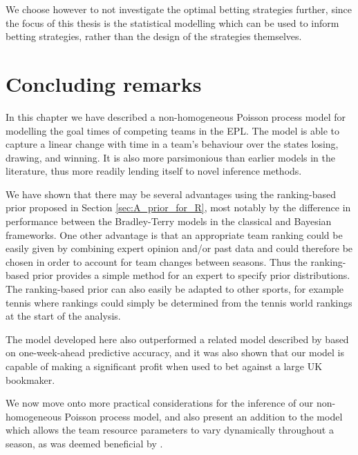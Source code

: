 We choose however to not investigate the optimal betting strategies further, since the focus of this thesis is the
statistical modelling which can be used to inform betting strategies, rather than the design of the strategies
themselves.


\section{Concluding remarks} 
\label{sec:Concluding_remarks_adaptive}

In this chapter we have described a non-homogeneous Poisson process model for modelling the goal times of competing
teams in the \gls{EPL}. The model is able to capture a linear change with time in a team's behaviour over the states
losing, drawing, and winning. It is also more parsimonious than earlier models in the literature, thus more readily
lending itself to novel inference methods.

We have shown that there may be several advantages using the ranking-based prior proposed in Section
\ref{sec:A_prior_for_R}, most notably by the difference in performance between the Bradley-Terry models in the classical
and Bayesian frameworks. One other advantage is that an appropriate team ranking could be easily given by combining
expert opinion and/or past data and could therefore be chosen in order to account for team changes between seasons. Thus
the ranking-based prior provides a simple method for an expert to specify prior distributions. The ranking-based prior
can also easily be adapted to other sports, for example tennis where rankings could simply be determined from the tennis
world rankings at the start of the analysis.

The model developed here also outperformed a related model described by \cite{DixonRobinson1998} based on one-week-ahead
predictive accuracy, and it was also shown that our model is capable of making a significant profit when used to bet
against a large UK bookmaker.

We now move onto more practical considerations for the inference of our non-homogeneous Poisson process model, and also
present an addition to the model which allows the team resource parameters to vary dynamically throughout a season, as
was deemed beneficial by \cite{Owen2011}.
